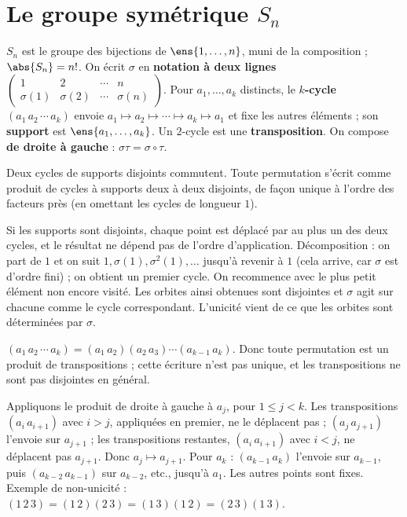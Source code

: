 \section{Le groupe symétrique $S_n$}
\begin{definition}
$S_n$ est le groupe des bijections de $\ens{1,\dots,n}$, muni de la composition ; $\abs{S_n}=n!$. On écrit $\sigma$ en \textbf{notation à deux lignes} $\begin{pmatrix}1&2&\cdots&n\\\sigma(1)&\sigma(2)&\cdots&\sigma(n)\end{pmatrix}$. Pour $a_1,\dots,a_k$ distincts, le \textbf{$k$-cycle} $(a_1\,a_2\,\cdots\,a_k)$ envoie $a_1\mapsto a_2\mapsto\cdots\mapsto a_k\mapsto a_1$ et fixe les autres éléments ; son \textbf{support} est $\ens{a_1,\dots,a_k}$. Un $2$-cycle est une \textbf{transposition}. On compose \textbf{de droite à gauche} : $\sigma\tau=\sigma\circ\tau$.
\end{definition}
\begin{proposition}\label{prop-cycles}
Deux cycles de supports disjoints commutent. Toute permutation s'écrit comme produit de cycles à supports deux à deux disjoints, de façon unique à l'ordre des facteurs près (en omettant les cycles de longueur $1$).
\end{proposition}
\begin{preuve}
Si les supports sont disjoints, chaque point est déplacé par au plus un des deux cycles, et le résultat ne dépend pas de l'ordre d'application. Décomposition : on part de $1$ et on suit $1,\sigma(1),\sigma^2(1),\dots$ jusqu'à revenir à $1$ (cela arrive, car $\sigma$ est d'ordre fini) ; on obtient un premier cycle. On recommence avec le plus petit élément non encore visité. Les orbites ainsi obtenues sont disjointes et $\sigma$ agit sur chacune comme le cycle correspondant. L'unicité vient de ce que les orbites sont déterminées par $\sigma$.
\end{preuve}
\begin{proposition}\label{prop-transpositions}
$(a_1\,a_2\,\cdots\,a_k)=(a_1\,a_2)(a_2\,a_3)\cdots(a_{k-1}\,a_k)$. Donc toute permutation est un produit de transpositions ; cette écriture n'est pas unique, et les transpositions ne sont pas disjointes en général.
\end{proposition}
\begin{preuve}
Appliquons le produit de droite à gauche à $a_j$, pour $1\le j<k$. Les transpositions $(a_i\,a_{i+1})$ avec $i>j$, appliquées en premier, ne le déplacent pas ; $(a_j\,a_{j+1})$ l'envoie sur $a_{j+1}$ ; les transpositions restantes, $(a_i\,a_{i+1})$ avec $i<j$, ne déplacent pas $a_{j+1}$. Donc $a_j\mapsto a_{j+1}$. Pour $a_k$ : $(a_{k-1}\,a_k)$ l'envoie sur $a_{k-1}$, puis $(a_{k-2}\,a_{k-1})$ sur $a_{k-2}$, etc., jusqu'à $a_1$. Les autres points sont fixes. Exemple de non-unicité : $(1\,2\,3)=(1\,2)(2\,3)=(1\,3)(1\,2)=(2\,3)(1\,3)$.
\end{preuve}
